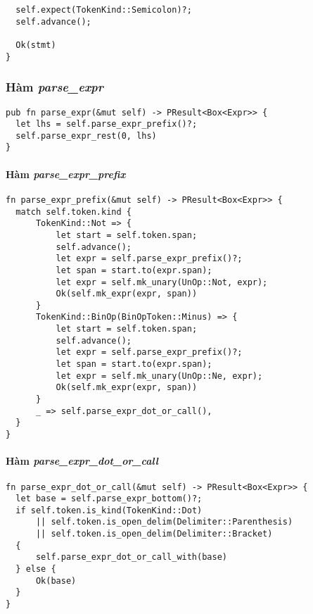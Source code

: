 {\begin{lstlisting}
  self.expect(TokenKind::Semicolon)?;
  self.advance();

  Ok(stmt)
}
\end{lstlisting}

\subsubsection{Hàm \textit{parse\_expr}}
\label{ap1:expr}
\begin{lstlisting}
pub fn parse_expr(&mut self) -> PResult<Box<Expr>> {
  let lhs = self.parse_expr_prefix()?;
  self.parse_expr_rest(0, lhs)
}
\end{lstlisting}

\paragraph{Hàm \textit{parse\_expr\_prefix}}
\label{ap1:expr_prefix}
\begin{lstlisting}
fn parse_expr_prefix(&mut self) -> PResult<Box<Expr>> {
  match self.token.kind {
      TokenKind::Not => {
          let start = self.token.span;
          self.advance();
          let expr = self.parse_expr_prefix()?;
          let span = start.to(expr.span);
          let expr = self.mk_unary(UnOp::Not, expr);
          Ok(self.mk_expr(expr, span))
      }
      TokenKind::BinOp(BinOpToken::Minus) => {
          let start = self.token.span;
          self.advance();
          let expr = self.parse_expr_prefix()?;
          let span = start.to(expr.span);
          let expr = self.mk_unary(UnOp::Ne, expr);
          Ok(self.mk_expr(expr, span))
      }
      _ => self.parse_expr_dot_or_call(),
  }
}
\end{lstlisting}

\paragraph{Hàm \textit{parse\_expr\_dot\_or\_call}}
\label{ap1:expr_dot_or_call}
\begin{lstlisting}
fn parse_expr_dot_or_call(&mut self) -> PResult<Box<Expr>> {
  let base = self.parse_expr_bottom()?;
  if self.token.is_kind(TokenKind::Dot)
      || self.token.is_open_delim(Delimiter::Parenthesis)
      || self.token.is_open_delim(Delimiter::Bracket)
  {
      self.parse_expr_dot_or_call_with(base)
  } else {
      Ok(base)
  }
}
\end{lstlisting}

}
